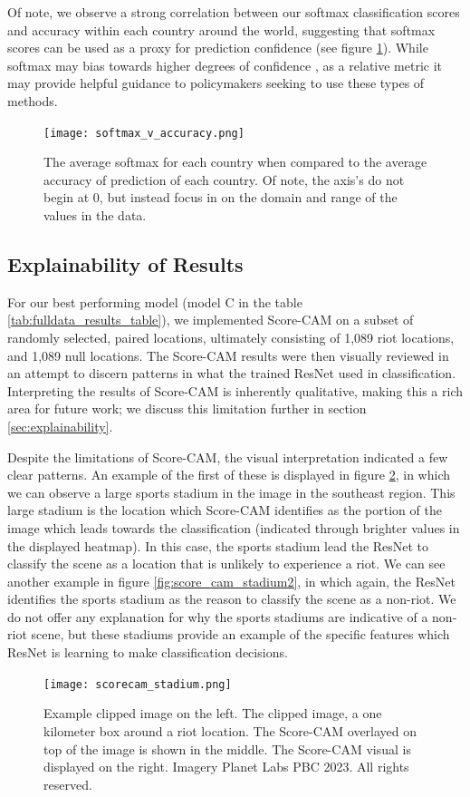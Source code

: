 Of note, we observe a strong correlation between our softmax classification scores and accuracy within each country around the world, suggesting that softmax scores can be used as a proxy for prediction confidence (see figure \ref{fig:softmax_v_accuracy}).  While softmax may bias towards higher degrees of confidence \citep{pearce2021understanding, subramanya2017confidence}, as a relative metric it may provide helpful guidance to policymakers seeking to use these types of methods.

\begin{figure}
    \centering
    \texttt{[image: softmax\_v\_accuracy.png]}
    \caption{The average softmax for each country when compared to the average accuracy of prediction of each country.  Of note, the axis's do not begin at 0, but instead focus in on the domain and range of the values in the data.}
    \label{fig:softmax_v_accuracy}
\end{figure}


\subsection{Explainability of Results}

For our best performing model (model C in the table \ref{tab:fulldata_results_table}), we implemented Score-CAM on a subset of randomly selected, paired locations, ultimately consisting of 1,089 riot locations, and 1,089 null locations.  The Score-CAM results were then visually reviewed in an attempt to discern patterns in what the trained ResNet used in classification.  Interpreting the results of Score-CAM is inherently qualitative, making this a rich area for future work; we discuss this limitation further in section \ref{sec:explainability}.  
\par
Despite the limitations of Score-CAM, the visual interpretation indicated a few clear patterns.  An example of the first of these is displayed in figure \ref{fig:score_cam_stadium}, in which we can observe a large sports stadium in the image in the southeast region.  This large stadium is the location which Score-CAM identifies as the portion of the image which leads towards the classification (indicated through brighter values in the displayed heatmap).  In this case, the sports stadium lead the ResNet to classify the scene as a location that is unlikely to experience a riot.  We can see another example in figure \ref{fig:score_cam_stadium2}, in which again, the ResNet identifies the sports stadium as the reason to classify the scene as a non-riot.  We do not offer any explanation for why the sports stadiums are indicative of a non-riot scene, but these stadiums provide an example of the specific features which ResNet is learning to make classification decisions.  
\begin{figure}
    \centering
    \texttt{[image: scorecam\_stadium.png]}
    \caption{Example clipped image on the left.  The clipped image, a one kilometer box around a riot location.  The Score-CAM overlayed on top of the image is shown in the middle.  The Score-CAM visual is displayed on the right. Imagery \textcopyright Planet Labs PBC 2023. All rights reserved.}
    \label{fig:score_cam_stadium}
\end{figure}

